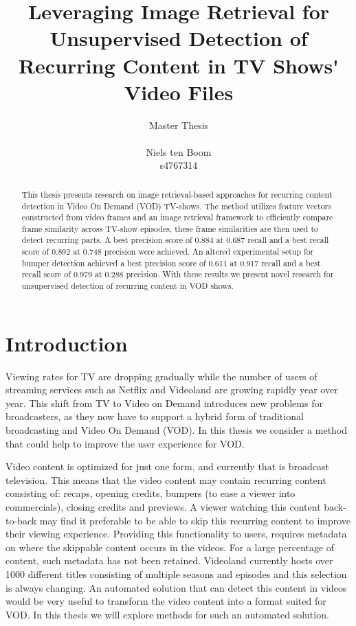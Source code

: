 \documentclass{article}
\begin{document}
\title{Leveraging Image Retrieval for Unsupervised Detection of Recurring Content in TV Shows\'{} Video Files}
\author{Master Thesis\\ \\ Niels ten Boom  \\ s4767314}

\date{\vspace{-3ex}}

\maketitle
\newpage

\begin{abstract}
This thesis presents research on image retrieval-based approaches for recurring content detection in Video On Demand (VOD) TV-shows. The method utilizes feature vectors constructed from video frames and an image retrieval framework to efficiently compare frame similarity across TV-show episodes, these frame similarities are then used to detect recurring parts. A best precision score of 0.884 at 0.687 recall and a best recall score of 0.892 at 0.748 precision were achieved. An altered experimental setup for bumper detection achieved a best precision score of 0.611 at 0.917 recall and a best recall score of 0.979 at 0.288 precision. With these results we present novel research for unsupervised detection of recurring content in VOD shows.
\end{abstract}
\newpage

\tableofcontents
\newpage

\section{Introduction} \label{introduction}
Viewing rates for TV are dropping gradually while the number of users of streaming services such as Netflix and Videoland are growing rapidly year over year. This shift from TV to Video on Demand introduces new problems for broadcasters, as they now have to support a hybrid form of traditional broadcasting and Video On Demand (VOD). In this thesis we consider a method that could help to improve the user experience for VOD.

Video content is optimized for just one form, and currently that is broadcast television. This means that the video content may contain recurring content consisting of: recaps, opening credits, bumpers (to ease a viewer into commercials), closing credits and previews. A viewer watching this content back-to-back may find it preferable to be able to skip this recurring content to improve their viewing experience. Providing this functionality to users, requires metadata on where the skippable content occurs in the videos. For a large percentage of content, such metadata has not been retained. Videoland currently hosts over 1000 different titles consisting of multiple seasons and episodes and this selection is always changing. An automated solution that can detect this content in videos would be very useful to transform the video content into a format suited for VOD. In this thesis we will explore methods for such an automated solution.
\end{document}
